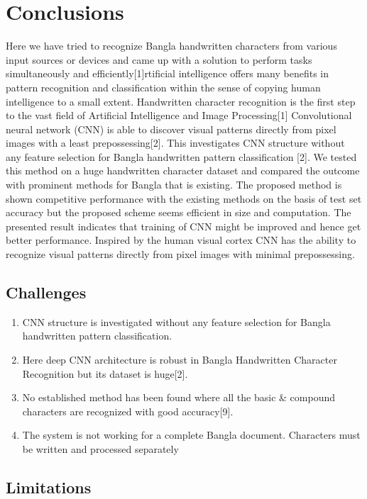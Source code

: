 \documentclass{article}
\begin{document}
\section{Conclusions}
Here we have tried to recognize Bangla handwritten characters from various input sources or devices and came up with a solution to perform tasks simultaneously and efficiently[1]rtificial intelligence offers many benefits in pattern recognition and classification within the sense of copying human intelligence to a small extent. Handwritten character recognition is the first step to the vast field of Artificial Intelligence and Image Processing[1]
Convolutional neural network (CNN) is able to discover visual patterns directly from pixel images with a least prepossessing[2]. This investigates CNN structure without any feature selection for Bangla handwritten pattern classification [2]. We tested this method on a huge handwritten character dataset and compared the outcome with prominent methods for Bangla that is existing. The proposed method is shown competitive performance with the existing methods on the basis of test set accuracy but the proposed scheme seems efficient in size and computation. The presented result indicates that training of CNN might be improved and hence get better performance. Inspired by the human visual cortex CNN has the ability to recognize visual patterns directly from pixel images with minimal prepossessing.

\subsection{Challenges}
\begin{enumerate}
\item CNN structure is investigated without any feature selection for Bangla handwritten pattern classification. 
\item Here deep CNN architecture is robust in Bangla Handwritten Character Recognition but its dataset is huge[2]. 
\item No established method has been found where all the basic & compound characters are recognized with good accuracy[9].
\item The system is not working for a complete Bangla document. Characters must be written and processed separately
\end{enumerate}

\subsection{Limitations}
\end{document}
